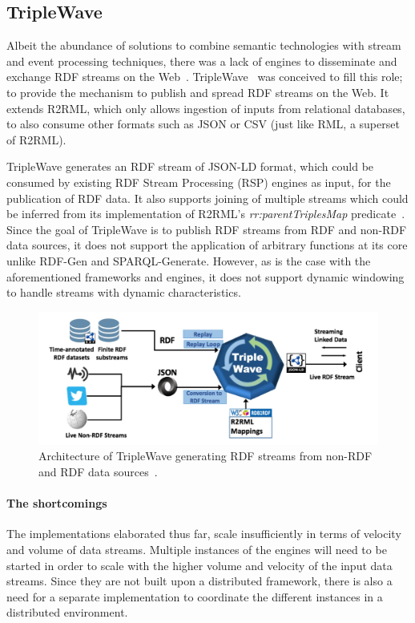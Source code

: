 \subsection{TripleWave}
Albeit the abundance of solutions to combine semantic technologies with stream and event processing 
techniques, there was a lack of engines to disseminate and exchange RDF streams on the Web~\cite{triple_wave}. 
TripleWave~\cite{triple_wave} was conceived to fill this role; to provide the mechanism to publish and spread RDF streams on the Web. 
It extends R2RML, which only allows ingestion of inputs from relational databases, 
to also consume other formats such as JSON or CSV (just like RML, a superset of R2RML). 

TripleWave generates an RDF stream of JSON-LD format, which could be consumed by existing
RDF Stream Processing (RSP) engines as input, for the publication of RDF data.
It also supports joining of multiple streams which could be inferred from its implementation of R2RML's \emph{rr:parentTriplesMap} predicate~\cite{triple_wave}. Since the goal of TripleWave 
is to publish RDF streams from RDF and non-RDF data sources, it does not support the 
application of arbitrary functions at its core unlike RDF-Gen and SPARQL-Generate. 
However, as is the case with the aforementioned frameworks and engines, 
it does not support dynamic windowing to handle streams 
with dynamic characteristics. 


\begin{figure}[!htbp]
  \centering
  \includegraphics[width=\textwidth]{fig/triple-wave-arch.png}
  \caption{Architecture of TripleWave generating RDF streams from non-RDF and RDF data sources~\cite{triple_wave}. }
  \label{fig:triple-wave-arch}
\end{figure}

\paragraph{The shortcomings}%
The implementations elaborated thus far, scale insufficiently in terms of velocity and 
volume of data streams. Multiple instances of the engines will need to 
be started in order to scale with the higher volume and velocity of 
the input data streams. Since they are not built upon a distributed framework, 
there is also a need for a separate implementation to coordinate the different 
instances in a distributed environment. 

